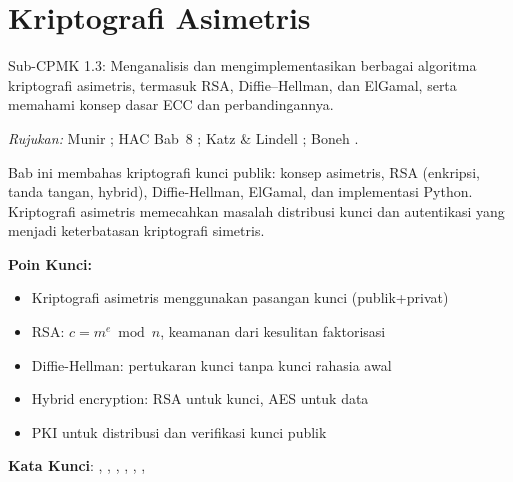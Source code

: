 \documentclass[main.tex]{subfiles}
\begin{document}
\chapter{Kriptografi Asimetris}

\begin{subcpmk}
  \item Sub-CPMK 1.3: Menganalisis dan mengimplementasikan berbagai algoritma kriptografi asimetris, termasuk RSA, Diffie--Hellman, dan ElGamal, serta memahami konsep dasar ECC dan perbandingannya.
\end{subcpmk}

\noindent\textit{Rujukan:} Munir \cite{munir2019,munir_slides_itb}; HAC Bab~8 \cite{hac_online}; Katz \& Lindell \cite{katz2020}; Boneh \cite{boneh_cs255}.








\begin{rangkuman}
Bab ini membahas kriptografi kunci publik: konsep asimetris, RSA (enkripsi, tanda tangan, hybrid), Diffie-Hellman, ElGamal, dan implementasi Python. Kriptografi asimetris memecahkan masalah distribusi kunci dan autentikasi yang menjadi keterbatasan kriptografi simetris.

\textbf{Poin Kunci:}
\begin{itemize}
  \item Kriptografi asimetris menggunakan pasangan kunci (publik+privat)
  \item RSA: $c = m^e \bmod n$, keamanan dari kesulitan faktorisasi
  \item Diffie-Hellman: pertukaran kunci tanpa kunci rahasia awal
  \item Hybrid encryption: RSA untuk kunci, AES untuk data
  \item PKI untuk distribusi dan verifikasi kunci publik
\end{itemize}

\textbf{Kata Kunci}: , , , , , , 
\end{rangkuman}
\end{document}
